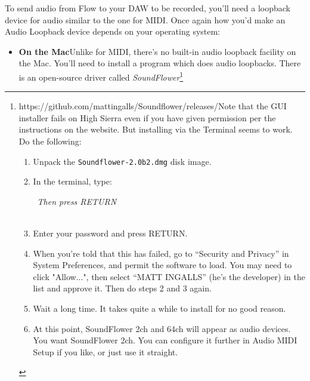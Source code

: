 \documentclass{article}
\begin{document}
To send audio from Flow to your DAW to be recorded, you'll need a loopback device for audio similar to the one for MIDI.   Once again how you'd make an Audio Loopback device depends on your operating system:

\begin{itemize}
\item {\bf On the Mac}\quad Unlike for MIDI, there's no built-in audio loopback facility on the Mac.  You'll need to install a program which does audio loopbacks.  There is an open-source driver called {\it SoundFlower}\footnote{https:/\!/github.com/mattingalls/Soundflower/releases/\qquad Note that the GUI installer fails on High Sierra even if you have given permission per the instructions on the website.  But installing via the Terminal seems to work.  Do the following:

\begin{enumerate}
\item Unpack the {\tt Soundflower-2.0b2.dmg} disk image.
\item In the terminal, type:
\begin{tabbing}
~\hspace{5em}{\tt cd /Volumes/Soundflower-2.0b2}\hspace{2in}\= {\it Then press RETURN}\\
~\hspace{5em}{\tt sudo installer -pkg Soundflower.pkg -target /}
\end{tabbing}
\item Enter your password and press RETURN.
\item When you're told that this has failed, go to ``Security and Privacy'' in System Preferences, and permit the software to load.  You may need to click "Allow...", then select ``MATT INGALLS'' (he's the developer) in the list and approve it.  Then do steps 2 and 3 again.
\item Wait a long time.  It takes quite a while to install for no good reason.
\item At this point, SoundFlower 2ch and 64ch will appear as audio devices.  You want SoundFlower 2ch.  You can configure it further in Audio MIDI Setup if you like, or just use it straight.
\end{enumerate}
}

\end{itemize}
\end{document}
